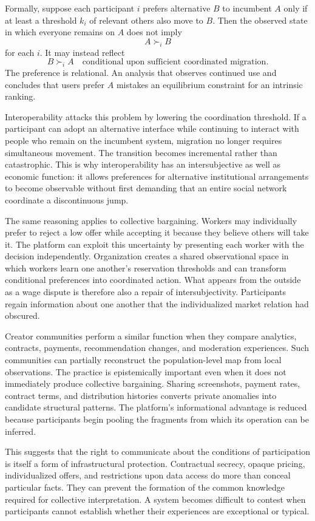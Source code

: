 \documentclass[11pt]{article}
\begin{document}
Formally, suppose each participant \(i\) prefers alternative \(B\) to incumbent \(A\) only if at least a threshold \(k_i\) of relevant others also move to \(B\). Then the observed state in which everyone remains on \(A\) does not imply
\[
A \succ_i B
\]
for each \(i\). It may instead reflect
\[
B \succ_i A
\quad\text{conditional upon sufficient coordinated migration}.
\]
The preference is relational. An analysis that observes continued use and concludes that users prefer \(A\) mistakes an equilibrium constraint for an intrinsic ranking.

Interoperability attacks this problem by lowering the coordination threshold. If a participant can adopt an alternative interface while continuing to interact with people who remain on the incumbent system, migration no longer requires simultaneous movement. The transition becomes incremental rather than catastrophic. This is why interoperability has an intersubjective as well as economic function: it allows preferences for alternative institutional arrangements to become observable without first demanding that an entire social network coordinate a discontinuous jump.

The same reasoning applies to collective bargaining. Workers may individually prefer to reject a low offer while accepting it because they believe others will take it. The platform can exploit this uncertainty by presenting each worker with the decision independently. Organization creates a shared observational space in which workers learn one another's reservation thresholds and can transform conditional preferences into coordinated action. What appears from the outside as a wage dispute is therefore also a repair of intersubjectivity. Participants regain information about one another that the individualized market relation had obscured.

Creator communities perform a similar function when they compare analytics, contracts, payments, recommendation changes, and moderation experiences. Such communities can partially reconstruct the population-level map from local observations. The practice is epistemically important even when it does not immediately produce collective bargaining. Sharing screenshots, payment rates, contract terms, and distribution histories converts private anomalies into candidate structural patterns. The platform's informational advantage is reduced because participants begin pooling the fragments from which its operation can be inferred.

This suggests that the right to communicate about the conditions of participation is itself a form of infrastructural protection. Contractual secrecy, opaque pricing, individualized offers, and restrictions upon data access do more than conceal particular facts. They can prevent the formation of the common knowledge required for collective interpretation. A system becomes difficult to contest when participants cannot establish whether their experiences are exceptional or typical.
\end{document}
